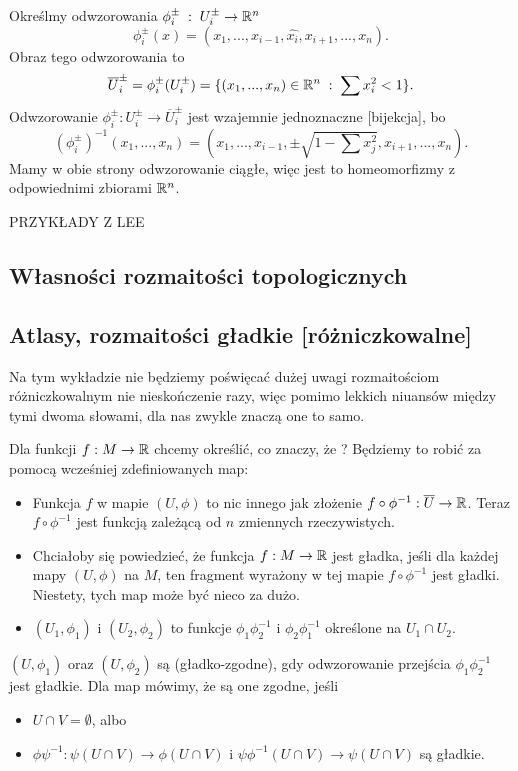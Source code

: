 Określmy odwzorowania $\phi^\pm_i\;:\;U_i^\pm\to\mathbb{R}^n$
$$\phi_i^\pm(x)=(x_1,...,x_{i-1},\hat{x_i},x_{i+1},...,x_n).$$
Obraz tego odwzorowania to
$$\overline U_i^\pm=\phi_i^\pm(U_i^\pm)=\{(x_1,...,x_n)\in \mathbb{R}^n\;:\;\sum x_i^2<1\}.$$
Odwzorowanie $\phi_i^\pm: U_i^\pm\to\overline U_i^\pm$ jest wzajemnie jednoznaczne [bijekcja], bo
$$(\phi_i^\pm)^{-1}(x_1,...,x_n)=(x_1,...,x_{i-1}, \pm\sqrt{1-\sum x_j^2}, x_{i+1},...,x_n).$$
Mamy w obie strony odwzorowanie ciągłe, więc jest to homeomorfizmy z odpowiednimi zbiorami $\mathbb{R}^n$.

{\Large\color{orange} PRZYKŁADY Z LEE}

\subsection{Własności rozmaitości topologicznych}

\subsection{Atlasy, rozmaitości gładkie [różniczkowalne]}

Na tym wykładzie nie będziemy poświęcać dużej uwagi rozmaitościom różniczkowalnym nie nieskończenie razy, więc pomimo lekkich niuansów między tymi dwoma słowami, dla nas zwykle znaczą one to samo.
\medskip

Dla funkcji $f:M\to\mathbb{R}$ chcemy określić, co znaczy, że ? Będziemy to robić za pomocą wcześniej zdefiniowanych map:
\begin{itemize}
    \item Funkcja $f$  w mapie $(U, \phi)$ to nic innego jak złożenie $f\circ \phi^{-1}:\overline U\to \mathbb{R}$. Teraz $f\circ\phi^{-1}$ jest funkcją zależącą od $n$ zmiennych rzeczywistych.
    \item Chciałoby się powiedzieć, że funkcja $f: M\to\mathbb{R}$ jest gładka, jeśli dla każdej mapy $(U, \phi)$ na $M$, ten fragment wyrażony w tej mapie $f\circ\phi^{-1}$ jest gładki. Niestety, tych map może być nieco za dużo.
    \item {} $(U_1,\phi_1)$ i $(U_2,\phi_2)$ to funkcje $\phi_1\phi_2^{-1}$ i $\phi_2\phi_1^{-1}$ określone na $U_1\cap U_2$.
\end{itemize}

\begin{definicja}
 $(U, \phi_1)$ oraz $(U, \phi_2)$ są  (gładko-zgodne), gdy odwzorowanie przejścia $\phi_1\phi_2^{-1}$ jest gładkie. Dla map  mówimy, że są one zgodne, jeśli 
\end{definicja}
\begin{itemize}
    \item $U\cap V=\emptyset$, albo
    \item $\phi\psi^{-1}:\psi(U\cap V)\to \phi(U\cap V)$ i $\psi\phi^{-1}(U\cap V)\to \psi(U\cap V)$ są gładkie.
\end{itemize}
\medskip


